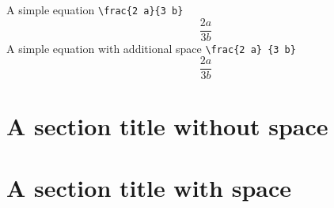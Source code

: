 \documentclass{article}
\begin{document}
A simple equation \verb|\frac{2 a}{3 b}|
$$
\frac{2a}{3b}
$$
A simple equation with additional space \verb|\frac{2 a} {3 b}|
$$
\frac{2 a}{3 b}
$$

\section [Section without space]{A section title without space}

\section [Section with space] {A section title with space}
\end{document}
